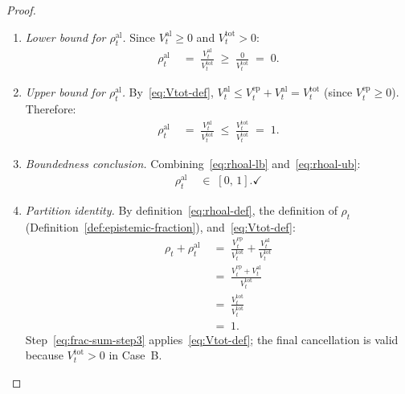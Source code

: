 \documentclass[12pt,openany]{book}
\numberwithin{equation}{chapter}
\theoremstyle{plain}
\theoremstyle{definition}
\theoremstyle{remark}
\numberwithin{equation}{chapter}
\theoremstyle{plain}
\begin{document}
\begin{proof}
\begin{enumerate}
  \item \emph{Lower bound for $\rho^{\mathrm{al}}_t$.}
        Since $V^{\mathrm{al}}_t \geq 0$ and
        $V^{\mathrm{tot}}_t > 0$:
        \begin{align}
          \rho^{\mathrm{al}}_t
          &\;=\; \frac{V^{\mathrm{al}}_t}{V^{\mathrm{tot}}_t}
           \;\geq\; \frac{0}{V^{\mathrm{tot}}_t}
           \;=\; 0.
          \label{eq:rhoal-lb}
        \end{align}

  \item \emph{Upper bound for $\rho^{\mathrm{al}}_t$.}
        By~\eqref{eq:Vtot-def}, $V^{\mathrm{al}}_t \leq
        V^{\mathrm{ep}}_t + V^{\mathrm{al}}_t = V^{\mathrm{tot}}_t$
        (since $V^{\mathrm{ep}}_t \geq 0$).  Therefore:
        \begin{align}
          \rho^{\mathrm{al}}_t
          &\;=\; \frac{V^{\mathrm{al}}_t}{V^{\mathrm{tot}}_t}
           \;\leq\; \frac{V^{\mathrm{tot}}_t}{V^{\mathrm{tot}}_t}
           \;=\; 1.
          \label{eq:rhoal-ub}
        \end{align}

  \item \emph{Boundedness conclusion.}
        Combining~\eqref{eq:rhoal-lb} and~\eqref{eq:rhoal-ub}:
        \begin{align}
          \rho^{\mathrm{al}}_t &\;\in\; [0,\,1]. \checkmark
          \label{eq:rhoal-bounded}
        \end{align}

  \item \emph{Partition identity.}
        By definition~\eqref{eq:rhoal-def}, the definition of $\rho_t$
        (Definition~\ref{def:epistemic-fraction}), and~\eqref{eq:Vtot-def}:
        \begin{align}
          \rho_t + \rho^{\mathrm{al}}_t
          &\;=\; \frac{V^{\mathrm{ep}}_t}{V^{\mathrm{tot}}_t}
                + \frac{V^{\mathrm{al}}_t}{V^{\mathrm{tot}}_t}
          \label{eq:frac-sum-step1} \\[4pt]
          &\;=\; \frac{V^{\mathrm{ep}}_t + V^{\mathrm{al}}_t}
                      {V^{\mathrm{tot}}_t}
          \label{eq:frac-sum-step2} \\[4pt]
          &\;=\; \frac{V^{\mathrm{tot}}_t}{V^{\mathrm{tot}}_t}
          \label{eq:frac-sum-step3} \\[4pt]
          &\;=\; 1.
          \label{eq:frac-sum-proof}
        \end{align}
        Step~\eqref{eq:frac-sum-step3} applies~\eqref{eq:Vtot-def};
        the final cancellation is valid because $V^{\mathrm{tot}}_t > 0$
        in Case~B. \checkmark
\end{enumerate}


\end{proof}
\end{document}
